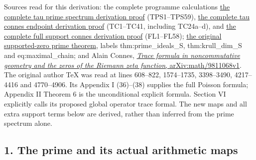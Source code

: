 \documentclass[
  10pt,
  a4paper,
]{article}
\begin{document}
Sources read for this derivation: the complete programme calculations
\href{https://github.com/KokunoYumeto/zeta-function-research-reader/blob/adfbfe74fa49e31cb7aa068cf755fb083be37c32/workbenches/splitzero-tandem/branches/tau-zero-prime-positivity/supporting_proofs/TAU_PRIME_SPECTRUM_DERIVATION.md}{the
complete tau prime spectrum derivation proof} (TPS1--TPS59),
\href{https://github.com/KokunoYumeto/zeta-function-research-reader/blob/adfbfe74fa49e31cb7aa068cf755fb083be37c32/workbenches/splitzero-tandem/branches/tau-zero-prime-positivity/supporting_proofs/TAU_CONNES_ENDPOINT_DERIVATION.md}{the
complete tau connes endpoint derivation proof} (TC1--TC41, including
TC24a--d), and
\href{https://github.com/KokunoYumeto/zeta-function-research-reader/blob/adfbfe74fa49e31cb7aa068cf755fb083be37c32/workbenches/splitzero-tandem/branches/tau-zero-prime-positivity/supporting_proofs/FULL_SUPPORT_CONNES_DERIVATION.md}{the
complete full support connes derivation proof} (FL1--FL58);
\href{https://github.com/KokunoYumeto/zeta-function-research-reader/blob/ac168d55cbb400a6c8926a00d67909ba65646ac5/workbenches/splitzero-tandem/branches/identity-absorber-square/sources/17555345_11.tex}{the
original supported-zero prime theorem}, labels thm:prime\_ideals\_S,
thm:krull\_dim\_S and eq:maximal\_chain; and Alain Connes,
\href{https://arxiv.org/abs/math/9811068}{\emph{Trace formula in
noncommutative geometry and the zeros of the Riemann zeta function},
arXiv:math/9811068v1}. The original author TeX was read at lines
608--822, 1574--1735, 3398--3490, 4217--4416 and 4770--4906. Its
Appendix I (36)--(38) supplies the full Poisson formula; Appendix II
Theorem 6 is the unconditional explicit formula. Section VI explicitly
calls its proposed global operator trace formal. The new maps and all
extra support terms below are derived, rather than inferred from the
prime spectrum alone.

\subsection{1. The prime and its actual arithmetic
maps}\label{the-prime-and-its-actual-arithmetic-maps}
\end{document}
